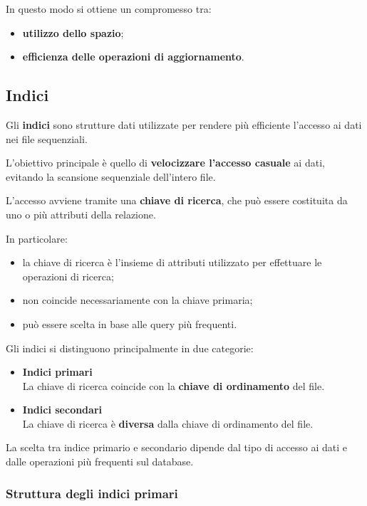 In questo modo si ottiene un compromesso tra:
\begin{itemize}
	\item \textbf{utilizzo dello spazio};
	\item \textbf{efficienza delle operazioni di aggiornamento}.
\end{itemize}
\subsection{Indici}

Gli \textbf{indici} sono strutture dati utilizzate per rendere più efficiente l'accesso ai dati nei file sequenziali.

L'obiettivo principale è quello di \textbf{velocizzare l'accesso casuale} ai dati, evitando la scansione sequenziale dell'intero file.

L'accesso avviene tramite una \textbf{chiave di ricerca}, che può essere costituita da uno o più attributi della relazione.

In particolare:
\begin{itemize}
	\item la chiave di ricerca è l'insieme di attributi utilizzato per effettuare le operazioni di ricerca;
	\item non coincide necessariamente con la chiave primaria;
	\item può essere scelta in base alle query più frequenti.
\end{itemize}

Gli indici si distinguono principalmente in due categorie:

\begin{itemize}
	\item \textbf{Indici primari} \\
	La chiave di ricerca coincide con la \textbf{chiave di ordinamento} del file.
	
	\item \textbf{Indici secondari} \\
	La chiave di ricerca è \textbf{diversa} dalla chiave di ordinamento del file.
\end{itemize}

La scelta tra indice primario e secondario dipende dal tipo di accesso ai dati e dalle operazioni più frequenti sul database.

\subsubsection{Struttura degli indici primari}

